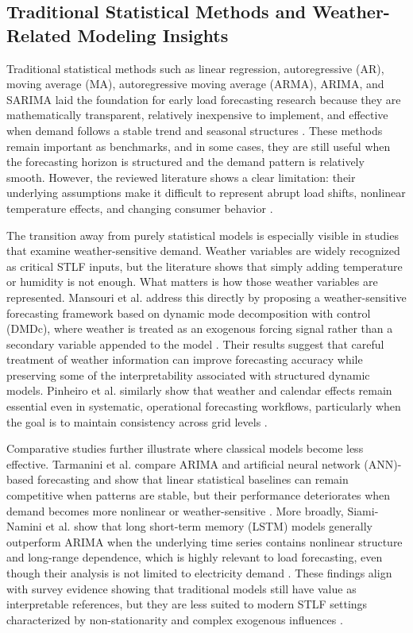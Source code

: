 \documentclass[conference]{IEEEtran}
\begin{document}
\subsection{Traditional Statistical Methods and Weather-Related Modeling Insights}
Traditional statistical methods such as linear regression, autoregressive (AR), moving average (MA), autoregressive moving average (ARMA), ARIMA, and SARIMA laid the foundation for early load forecasting research because they are mathematically transparent, relatively inexpensive to implement, and effective when demand follows a stable trend and seasonal structures \cite{hammad2020,vivas2020}. These methods remain important as benchmarks, and in some cases, they are still useful when the forecasting horizon is structured and the demand pattern is relatively smooth. However, the reviewed literature shows a clear limitation: their underlying assumptions make it difficult to represent abrupt load shifts, nonlinear temperature effects, and changing consumer behavior \cite{8614252,Tarmanini,hammad2020}.

The transition away from purely statistical models is especially visible in studies that examine weather-sensitive demand. Weather variables are widely recognized as critical STLF inputs, but the literature shows that simply adding temperature or humidity is not enough. What matters is how those weather variables are represented. Mansouri et al. address this directly by proposing a weather-sensitive forecasting framework based on dynamic mode decomposition with control (DMDc), where weather is treated as an exogenous forcing signal rather than a secondary variable appended to the model \cite{Mansouri}. Their results suggest that careful treatment of weather information can improve forecasting accuracy while preserving some of the interpretability associated with structured dynamic models. Pinheiro et al. similarly show that weather and calendar effects remain essential even in systematic, operational forecasting workflows, particularly when the goal is to maintain consistency across grid levels \cite{Pinheiro}.

Comparative studies further illustrate where classical models become less effective. Tarmanini et al. compare ARIMA and artificial neural network (ANN)-based forecasting and show that linear statistical baselines can remain competitive when patterns are stable, but their performance deteriorates when demand becomes more nonlinear or weather-sensitive \cite{Tarmanini}. More broadly, Siami-Namini et al. show that long short-term memory (LSTM) models generally outperform ARIMA when the underlying time series contains nonlinear structure and long-range dependence, which is highly relevant to load forecasting, even though their analysis is not limited to electricity demand \cite{8614252}. These findings align with survey evidence showing that traditional models still have value as interpretable references, but they are less suited to modern STLF settings characterized by non-stationarity and complex exogenous influences \cite{vivas2020,hammad2020}.
\end{document}

